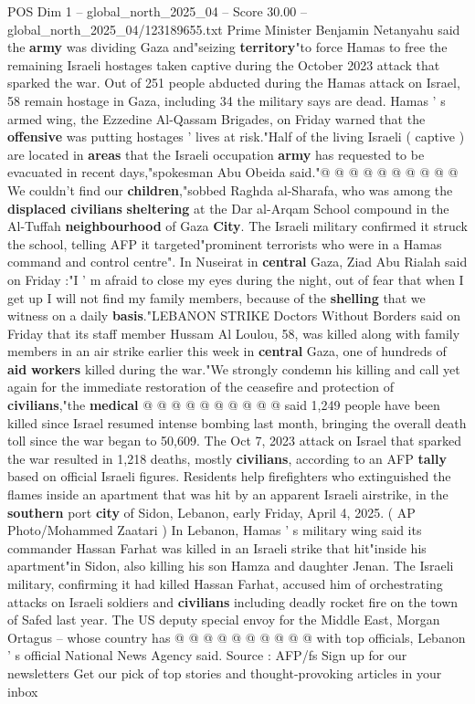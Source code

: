 \begin{textsample}{POS Dim 1 – global\_north\_2025\_04 – Score 30.00 – global\_north\_2025\_04/123189655.txt}
Prime Minister Benjamin Netanyahu said the \textbf{army} was dividing Gaza and"seizing \textbf{territory}"to force Hamas to free the remaining Israeli hostages taken captive during the October 2023 attack that sparked the war.
Out of 251 people abducted during the Hamas attack on Israel, 58 remain hostage in Gaza, including 34 the military says are dead.
Hamas ' s armed wing, the Ezzedine Al-Qassam Brigades, on Friday warned that the \textbf{offensive} was putting hostages ' lives at risk."Half of the living Israeli ( captive ) are located in \textbf{areas} that the Israeli occupation \textbf{army} has requested to be evacuated in recent days,"spokesman Abu Obeida said."@ @ @ @ @ @ @ @ @ @ We couldn't find our \textbf{children},"sobbed Raghda al-Sharafa, who was among the \textbf{displaced} \textbf{civilians} \textbf{sheltering} at the Dar al-Arqam School compound in the Al-Tuffah \textbf{neighbourhood} of Gaza \textbf{City}.
The Israeli military confirmed it struck the school, telling AFP it targeted"prominent terrorists who were in a Hamas command and control centre".
In Nuseirat in \textbf{central} Gaza, Ziad Abu Rialah said on Friday :"I ' m afraid to close my eyes during the night, out of fear that when I get up I will not find my family members, because of the \textbf{shelling} that we witness on a daily \textbf{basis}."LEBANON STRIKE Doctors Without Borders said on Friday that its staff member Hussam Al Loulou, 58, was killed along with family members in an air strike earlier this week in \textbf{central} Gaza, one of hundreds of \textbf{aid} \textbf{workers} killed during the war."We strongly condemn his killing and call yet again for the immediate restoration of the ceasefire and protection of \textbf{civilians},"the \textbf{medical} @ @ @ @ @ @ @ @ @ @ said 1,249 people have been killed since Israel resumed intense bombing last month, bringing the overall death toll since the war began to 50,609.
The Oct 7, 2023 attack on Israel that sparked the war resulted in 1,218 deaths, mostly \textbf{civilians}, according to an AFP \textbf{tally} based on official Israeli figures.
Residents help firefighters who extinguished the flames inside an apartment that was hit by an apparent Israeli airstrike, in the \textbf{southern} port \textbf{city} of Sidon, Lebanon, early Friday, April 4, 2025. ( AP Photo/Mohammed Zaatari ) In Lebanon, Hamas ' s military wing said its commander Hassan Farhat was killed in an Israeli strike that hit"inside his apartment"in Sidon, also killing his son Hamza and daughter Jenan.
The Israeli military, confirming it had killed Hassan Farhat, accused him of orchestrating attacks on Israeli soldiers and \textbf{civilians} including deadly rocket fire on the town of Safed last year.
The US deputy special envoy for the Middle East, Morgan Ortagus -- whose country has @ @ @ @ @ @ @ @ @ @ with top officials, Lebanon ' s official National News Agency said.
Source : AFP/fs Sign up for our newsletters Get our pick of top stories and thought-provoking articles in your inbox


\end{textsample}
